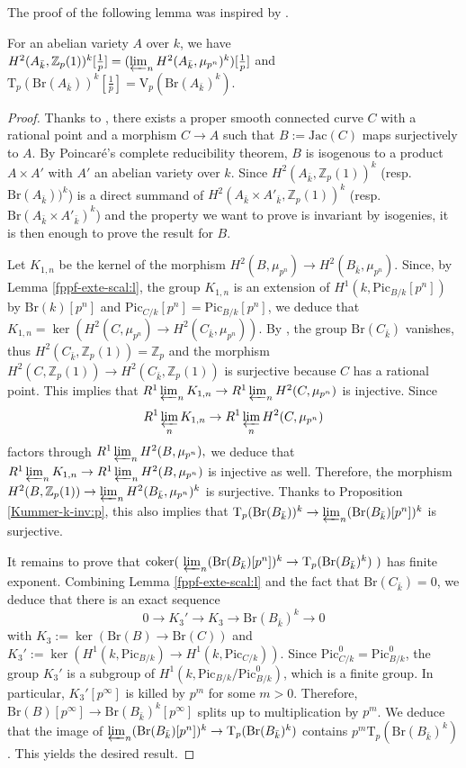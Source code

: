 \documentclass[11pt]{amsart}
\newcommand{\spa}{\medskip}
\newcommand{\kbar}{{\bar{k}}}
\newcommand{\Zp}{{\mathbb{Z}_{p}}}
\newcommand{\Pic}{\mathrm{Pic}}
\newcommand{\Br}{\mathrm{Br}}
\newcommand{\mupn}{{\mu_{p^n}}}
\newcommand{\Tp}{\mathrm{T}_p}
\newcommand{\Vp}{\mathrm{V}_p}
\begin{document}
The proof of the following lemma was inspired by \cite[Thm. 2.1]{CS13}.

\begin{prop}\label{tricky:p}For an abelian variety $A$ over $k$, we have $H^2(A_\kbar,\Zp(1))^{k}[\tfrac{1}{p}]=(\varprojlim_{n}H^2(A_\kbar,\mupn)^{k})[\tfrac{1}{p}]$ and $\Tp(\Br(A_{\kbar}))^{k}[\tfrac{1}{p}]=\Vp(\Br(A_{\kbar})^{k}).$
\end{prop}

\begin{proof}
Thanks to \cite[Thm. 11]{Kat99}, there exists a proper smooth connected curve $C$ with a rational point and a morphism $C\to A$ such that $B:=\mathrm{Jac}(C)$ maps surjectively to $A$. By Poincaré's complete reducibility theorem, $B$ is isogenous to a product $A\times A'$ with $A'$ an abelian variety over $k$. Since $H^2(A_\kbar,\Zp(1))^{k}$ (resp. $\Br(A_{\kbar}))^k$) is a direct summand of $H^2(A_\kbar\times A'_\kbar,\Zp(1))^{k}$ (resp. $\Br(A_\kbar\times A'_{\kbar})^k$) and the property we want to prove is invariant by isogenies, it is then enough to prove the result for $B$. 
\spa

Let $K_{1,n}$ be the kernel of the morphism $H^2(B,\mupn)\to H^2(B_\kbar,\mupn)$. Since, by Lemma \ref{fppf-exte-scal:l}, the group $K_{1,n}$ is an extension of $H^1(k,\Pic_{B/k}[p^n])$ by $\Br(k)[p^n]$ and $\Pic_{C/k}[p^n]=\Pic_{B/k}[p^n]$, we deduce that $K_{1,n}=\ker(H^2(C,\mupn)\to H^2(C_\kbar,\mupn))$. By \cite[Rmq. 2.5.b]{Gro68}, the group $\Br(C_\kbar)$ vanishes, thus $H^2(C_{\kbar},\Zp(1))=\Zp$ and the morphism $H^2(C,\Zp(1))\to H^2(C_{\kbar},\Zp(1))$ is surjective because $C$ has a rational point. This implies that $R^1 \varprojlim_{n}K_{1,n}\to R^1 \varprojlim_{n}H^2(C,\mupn)$ is injective. Since $$R^1 \varprojlim_{n}K_{1,n}\to R^1 \varprojlim_{n}H^2(C,\mupn)$$ factors through $R^1 \varprojlim_{n}H^2(B,\mupn),$ we deduce that $R^1 \varprojlim_{n}K_{1,n}\to R^1 \varprojlim_{n}H^2(B,\mupn)$ is injective as well. Therefore, the morphism $H^2(B,\Zp(1))\to \varprojlim_{n}H^2(B_\kbar,\mupn)^{k}$ is surjective. Thanks to Proposition \ref{Kummer-k-inv:p}, this also implies that $\Tp(\Br(B_{\kbar}))^{k}\to\varprojlim_n(\Br(B_\kbar)[p^n])^k$ is surjective.

\spa

It remains to prove that $\mathrm{coker}(\ \varprojlim_n(\Br(B_\kbar)[p^n])^k\to \Tp(\Br(B_\kbar)^k)\ )$ has finite exponent. Combining Lemma \ref{fppf-exte-scal:l} and the fact that $\Br(C_\kbar)=0$, we deduce that there is an exact sequence $$0\to K_3'\to K_3\to \Br(B_\kbar)^k\to 0$$ with $K_3:=\ker(\Br(B)\to \Br(C))$ and $K_3':=\ker(H^1(k,\Pic_{B/k})\to H^1(k,\Pic_{C/k}))$. Since $\Pic^0_{C/k}=\Pic^0_{B/k}$, the group $K_3'$ is a subgroup of $H^1(k,\Pic_{B/k}/\Pic^0_{B/k})$, which is a finite group. In particular, $K_3'[p^\infty]$ is killed by $p^m$ for some $m>0$. Therefore, $\Br(B)[p^\infty]\to \Br(B_\kbar)^k[p^\infty]$ splits up to multiplication by $p^m$. We deduce that the image of $\varprojlim_n(\Br(B_\kbar)[p^n])^k\to \Tp(\Br(B_\kbar)^k)$ contains $p^m\Tp(\Br(B_\kbar)^k)$. This yields the desired result. 
\end{proof}
\end{document}
